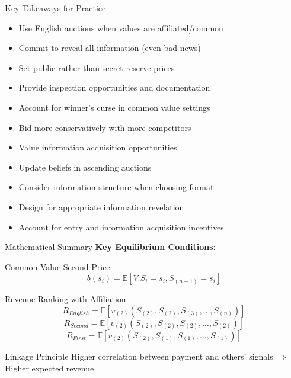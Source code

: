 \documentclass[xcolor={x11names}]{beamer}
\newcommand{\E}{\mathbb{E}}
\begin{document}
\begin{frame}{Key Takeaways for Practice}
\begin{tcolorbox}[colback=blue!5!white,colframe=blue!75!black,title=For Sellers]
\begin{itemize}
  \item Use English auctions when values are affiliated/common
  \item Commit to reveal all information (even bad news)
  \item Set public rather than secret reserve prices
  \item Provide inspection opportunities and documentation
\end{itemize}
\end{tcolorbox}

\begin{tcolorbox}[colback=green!5!white,colframe=green!75!black,title=For Bidders]
\begin{itemize}
  \item Account for winner's curse in common value settings
  \item Bid more conservatively with more competitors
  \item Value information acquisition opportunities
  \item Update beliefs in ascending auctions
\end{itemize}
\end{tcolorbox}

\begin{tcolorbox}[colback=red!5!white,colframe=red!75!black,title=For Mechanism Designers]
\begin{itemize}
  \item Consider information structure when choosing format
  \item Design for appropriate information revelation
  \item Account for entry and information acquisition incentives
\end{itemize}
\end{tcolorbox}
\end{frame}

\begin{frame}{Mathematical Summary}
\textbf{Key Equilibrium Conditions:}

\begin{block}{Common Value Second-Price}
$$b(s_i) = \E[V | S_i = s_i, S_{(n-1)} = s_i]$$
\end{block}

\begin{block}{Revenue Ranking with Affiliation}
$$R_{English} = \E[v_{(2)}(S_{(2)}, S_{(2)}, S_{(3)}, ..., S_{(n)})]$$
$$R_{Second} = \E[v_{(2)}(S_{(2)}, S_{(2)}, S_{(2)}, ..., S_{(2)})]$$
$$R_{First} = \E[v_{(2)}(S_{(2)}, S_{(1)}, S_{(1)}, ..., S_{(1)})]$$
\end{block}

\begin{block}{Linkage Principle}
Higher correlation between payment and others' signals $\Rightarrow$ Higher expected revenue
\end{block}
\end{frame}
\end{document}
